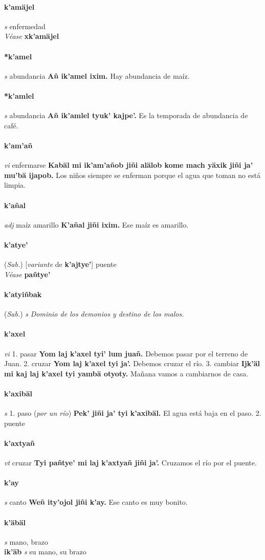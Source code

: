 \documentclass{scrbook}
\newcommand{\entry}[1]{\paragraph{#1}}
\newcommand{\onedefinition}[1]{#1.}
\newcommand{\nontranslationdef}[1]{\textit{#1}}
\newcommand{\partofspeech}[1]{\textit{#1}}
\newcommand{\spanishtranslation}[1]{#1}
\newcommand{\clarification}[1]{(\textit{#1})}
\newcommand{\cholexample}[1]{\textbf{#1}}
\newcommand{\exampletranslation}[1]{#1}
\newcommand{\alsosee}[1]{\\\textit{Véase} \textbf{#1}}
\newcommand{\relevantdialect}[1]{(\textit{#1})}
\newcommand{\secondaryentry}[1]{\\\textbf{#1}}
\newcommand{\secondpartofspeech}[1]{\textit{#1}}
\newcommand{\secondtranslation}[1]{#1}
\newcommand{\conjugationtense}[1]{[\textit{#1}}
\newcommand{\conjugationverb}[1]{de \textbf{#1}]}
\begin{document}
\begin{multicols}{2}
\entry{k'amäjel}
\partofspeech{s}
\spanishtranslation{enfermedad}
\alsosee{xk'amäjel}

\entry{*k'amel}
\partofspeech{s}
\spanishtranslation{abundancia}
\cholexample{Añ ik'amel ixim.}
\exampletranslation{Hay abundancia de maíz.}

\entry{*k'amlel}
\partofspeech{s}
\spanishtranslation{abundancia}
\cholexample{Añ ik'amlel tyuk' kajpe'.}
\exampletranslation{Es la temporada de abundancia de café.}

\entry{k'am'añ}
\partofspeech{vi}
\spanishtranslation{enfermarse}
\cholexample{Kabäl mi ik'am'añob jiñi alälob kome mach yäxik jiñi ja' mu'bä ijapob.}
\exampletranslation{Los niños siempre se enferman porque el agua que toman no está limpia.}

\entry{k'añal}
\partofspeech{adj}
\spanishtranslation{maíz amarillo}
\cholexample{K'añal jiñi ixim.}
\exampletranslation{Ese maíz es amarillo.}

\entry{k'atye'}
\relevantdialect{Sab.}
\conjugationtense{variante}
\conjugationverb{k'ajtye'}
\spanishtranslation{puente}
\alsosee{pañtye'}

\entry{k'atyiñbak}
\relevantdialect{Sab.}
\partofspeech{s}
\nontranslationdef{Dominio de los demonios y destino de los malos.}

\entry{k'axel}
\partofspeech{vi}
\onedefinition{1}
\spanishtranslation{pasar}
\cholexample{Yom laj k'axel tyi' lum juañ.}
\exampletranslation{Debemos pasar por el terreno de Juan.}
\onedefinition{2}
\spanishtranslation{cruzar}
\cholexample{Yom laj k'axel tyi ja'.}
\exampletranslation{Debemos cruzar el río.}
\onedefinition{3}
\spanishtranslation{cambiar}
\cholexample{Ijk'äl mi kaj laj k'axel tyi yambä otyoty.}
\exampletranslation{Mañana vamos a cambiarnos de casa.}

\entry{k'axibäl}
\partofspeech{s}
\onedefinition{1}
\spanishtranslation{paso}
\clarification{por un río}
\cholexample{Pek' jiñi ja' tyi k'axibäl.}
\exampletranslation{El agua está baja en el paso.}
\onedefinition{2}
\spanishtranslation{puente}

\entry{k'axtyañ}
\partofspeech{vt}
\spanishtranslation{cruzar}
\cholexample{Tyi pañtye' mi laj k'axtyañ jiñi ja'.}
\exampletranslation{Cruzamos el río por el puente.}

\entry{k'ay}
\partofspeech{s}
\spanishtranslation{canto}
\cholexample{Weñ ity'ojol jiñi k'ay.}
\exampletranslation{Ese canto es muy bonito.}

\entry{k'äbäl}
\partofspeech{s}
\spanishtranslation{mano, brazo}
\secondaryentry{ik'äb}
\secondpartofspeech{s}
\secondtranslation{su mano, su brazo}


\end{multicols}
\end{document}
